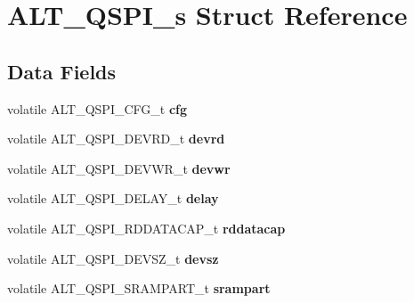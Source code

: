 \hypertarget{structALT__QSPI__s}{}\section{A\+L\+T\+\_\+\+Q\+S\+P\+I\+\_\+s Struct Reference}
\label{structALT__QSPI__s}
\subsection*{Data Fields}
\begin{DoxyCompactItemize}
\item 
\mbox{\label{structALT__QSPI__s_ad390e76d2fd3c58bdfc40e31b2e6a4e5}} 
volatile A\+L\+T\+\_\+\+Q\+S\+P\+I\+\_\+\+C\+F\+G\+\_\+t {\bfseries cfg}
\item 
\mbox{\label{structALT__QSPI__s_aefb4815d2a48d31970b26fe387897001}} 
volatile A\+L\+T\+\_\+\+Q\+S\+P\+I\+\_\+\+D\+E\+V\+R\+D\+\_\+t {\bfseries devrd}
\item 
\mbox{\label{structALT__QSPI__s_a24d1d2c8f6cde293070e2fa42af81dd8}} 
volatile A\+L\+T\+\_\+\+Q\+S\+P\+I\+\_\+\+D\+E\+V\+W\+R\+\_\+t {\bfseries devwr}
\item 
\mbox{\label{structALT__QSPI__s_a306493a7788e92e92e01ef60db774bcd}} 
volatile A\+L\+T\+\_\+\+Q\+S\+P\+I\+\_\+\+D\+E\+L\+A\+Y\+\_\+t {\bfseries delay}
\item 
\mbox{\label{structALT__QSPI__s_afaf649801fb082ebd2764e4f34a812a7}} 
volatile A\+L\+T\+\_\+\+Q\+S\+P\+I\+\_\+\+R\+D\+D\+A\+T\+A\+C\+A\+P\+\_\+t {\bfseries rddatacap}
\item 
\mbox{\label{structALT__QSPI__s_ad5d45a6b515f2031e133a5b22153f0e7}} 
volatile A\+L\+T\+\_\+\+Q\+S\+P\+I\+\_\+\+D\+E\+V\+S\+Z\+\_\+t {\bfseries devsz}
\item 
\mbox{\label{structALT__QSPI__s_a7df5ca179a9cebbc383080a8451e526a}} 
volatile A\+L\+T\+\_\+\+Q\+S\+P\+I\+\_\+\+S\+R\+A\+M\+P\+A\+R\+T\+\_\+t {\bfseries srampart}
\item 
\mbox{\label{structALT__QSPI__s_a85c7642eecc92b2868bb9fd01ffbeeca}} 

\end{DoxyCompactItemize}
